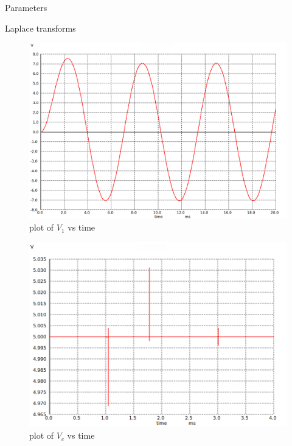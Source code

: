 \documentclass[journal,12pt,twocolumn]{IEEEtran}
\begin{document}
\begin{table}[ht]
    \begin{adjustbox}{width=\columnwidth}
       
    \end{adjustbox}
    \vspace{0.5cm}
    \caption{Parameters}
    \label{tab:Gate.ee.54.1}

\end{table}


\begin{table}[ht]
    
    \vspace{0.5cm}
    \caption{Laplace transforms}
    \label{tab:Gate.ee.54.2}
\end{table}

\begin{figure}[htbp]
    \centering
    \includegraphics[width=\columnwidth]{figs/fig1.png}
    \caption{plot of $V_1$ vs time}
\end{figure}

\begin{figure}[htbp]
    \centering
    \includegraphics[width=\columnwidth]{figs/fig2.png}
    \caption{plot of $V_c$ vs time}
\end{figure}
\end{document}
